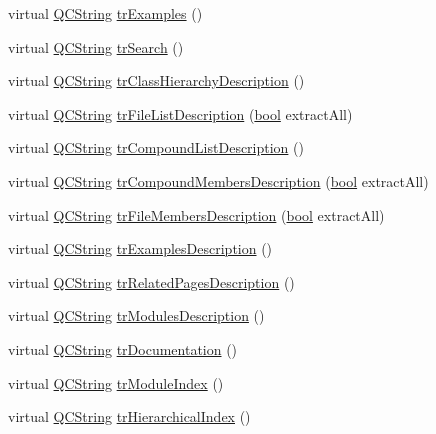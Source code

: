 \begin{DoxyCompactItemize}
virtual \hyperlink{class_q_c_string}{Q\+C\+String} \hyperlink{class_translator_czech_aec2387a34264dc6e602bf2765ba797f8}{tr\+Examples} ()
\item 
virtual \hyperlink{class_q_c_string}{Q\+C\+String} \hyperlink{class_translator_czech_aee75046e81d4646858d5c5f91c87b2f7}{tr\+Search} ()
\item 
virtual \hyperlink{class_q_c_string}{Q\+C\+String} \hyperlink{class_translator_czech_a13179bcc9afb184e1eae5c7826290240}{tr\+Class\+Hierarchy\+Description} ()
\item 
virtual \hyperlink{class_q_c_string}{Q\+C\+String} \hyperlink{class_translator_czech_a1097379b42a50377bf50a2d108abdf85}{tr\+File\+List\+Description} (\hyperlink{qglobal_8h_a1062901a7428fdd9c7f180f5e01ea056}{bool} extract\+All)
\item 
virtual \hyperlink{class_q_c_string}{Q\+C\+String} \hyperlink{class_translator_czech_abe717489d9743ec9d2ace3dc6c593fac}{tr\+Compound\+List\+Description} ()
\item 
virtual \hyperlink{class_q_c_string}{Q\+C\+String} \hyperlink{class_translator_czech_ad077658a3b91012b633e84f3d6213c95}{tr\+Compound\+Members\+Description} (\hyperlink{qglobal_8h_a1062901a7428fdd9c7f180f5e01ea056}{bool} extract\+All)
\item 
virtual \hyperlink{class_q_c_string}{Q\+C\+String} \hyperlink{class_translator_czech_a5ba6adc42bc37609f4b409fc68f8a7ba}{tr\+File\+Members\+Description} (\hyperlink{qglobal_8h_a1062901a7428fdd9c7f180f5e01ea056}{bool} extract\+All)
\item 
virtual \hyperlink{class_q_c_string}{Q\+C\+String} \hyperlink{class_translator_czech_a2d627bd24c6e2bb8e5b489ac70e490f1}{tr\+Examples\+Description} ()
\item 
virtual \hyperlink{class_q_c_string}{Q\+C\+String} \hyperlink{class_translator_czech_a59bd4448d5330e08f94b00616b0c6233}{tr\+Related\+Pages\+Description} ()
\item 
virtual \hyperlink{class_q_c_string}{Q\+C\+String} \hyperlink{class_translator_czech_aece287473059fd31d4700daadc9d0b7b}{tr\+Modules\+Description} ()
\item 
virtual \hyperlink{class_q_c_string}{Q\+C\+String} \hyperlink{class_translator_czech_aebe8cad7bd80207a444b50188fcb3662}{tr\+Documentation} ()
\item 
virtual \hyperlink{class_q_c_string}{Q\+C\+String} \hyperlink{class_translator_czech_a8e4934dd0d52c8bc1c44063189c4a07b}{tr\+Module\+Index} ()
\item 
virtual \hyperlink{class_q_c_string}{Q\+C\+String} \hyperlink{class_translator_czech_a67cef970a7460c4d681a33f55a068d46}{tr\+Hierarchical\+Index} ()

\end{DoxyCompactItemize}
